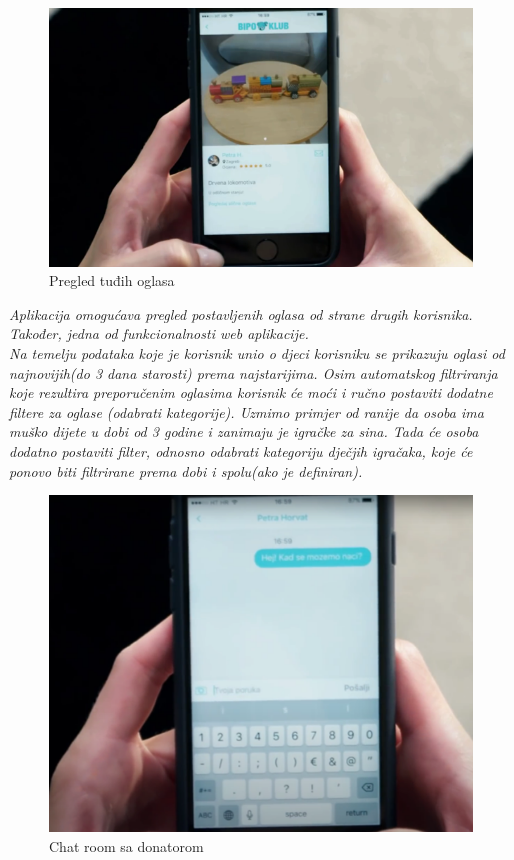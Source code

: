 		\newline
		\begin{figure}[h!]
			\center
			\includegraphics{Picture4.png}
			\caption{ Pregled tuđih oglasa}
			\label{fig4}
		\end{figure}
		\newline
		\textit{Aplikacija omogućava pregled postavljenih oglasa od strane drugih korisnika. Također, jedna od funkcionalnosti web aplikacije. }\\
		\newline
		\textit{Na temelju podataka koje je korisnik unio o djeci korisniku se prikazuju oglasi od najnovijih(do 3 dana starosti) prema najstarijima. Osim automatskog filtriranja koje rezultira preporučenim oglasima korisnik će moći i ručno postaviti dodatne filtere za oglase (odabrati kategorije). Uzmimo primjer od ranije da osoba ima muško dijete u dobi od 3 godine i zanimaju je igračke za sina. Tada će osoba dodatno postaviti filter, odnosno odabrati kategoriju dječjih igračaka, koje će ponovo biti filtrirane prema dobi i spolu(ako je definiran).   }\\
		\newline
		\begin{figure}[h!]
			\center
			\includegraphics{Picture5.png}
			\caption{ Chat room sa donatorom}
			\label{fig5}
		\end{figure}
